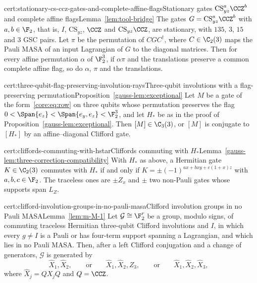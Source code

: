 
\begin{finitefact}{cert:stationary-cs-ccz-gates-and-complete-affine-flags}{Stationary gates $\mathrm{CS}_{yz}^a\CCZ^b$ and complete affine flags}{Lemma~\ref{lem:tool-bridge}}
The gates $G=\mathrm{CS}_{yz}^a\CCZ^b$ with $a,b\in\F_2$, that is, $I$, $\mathrm{CS}_{yz}$, $\CCZ$ and $\mathrm{CS}_{yz}\CCZ$, are stationary, with $135$, $3$, $15$ and $3$ GSC pairs. Let $\pi$ be the permutation of $CGC^\dagger$, where $C\in\C_2(3)$ maps the Pauli MASA of an input Lagrangian of $G$ to the diagonal matrices. Then for every affine permutation $\alpha$ of $\F_2^3$, if $\alpha\pi$ and the translations preserve a common complete affine flag, so do $\alpha$, $\pi$ and the translations.
\end{finitefact}

\begin{finitefact}{cert:three-qubit-flag-preserving-involution-rays}{Three-qubit involutions with a flag-preserving permutation}{Proposition~\ref{gauss-lem:exceptional}}
Let $M$ be a gate of the form~\eqref{core:eq:row} on three qubits whose permutation preserves the flag $0<\Span\{e_z\}<\Span\{e_y,e_z\}<\F_2^3$, and let $H_*$ be as in the proof of Proposition~\ref{gauss-lem:exceptional}. Then $[M]\in\C_3(3)$, or $[M]$ is conjugate to $[H_*]$ by an affine--diagonal Clifford gate.
\end{finitefact}

\begin{finitefact}{cert:cliffords-commuting-with-hstar}{Cliffords commuting with $H_*$}{Lemma~\ref{gauss-lem:three-correction-compatibility}}
With $H_*$ as above, a Hermitian gate $K\in\C_2(3)$ commutes with $H_*$ if and only if $K=\pm(-1)^{ax+bxy+c(1+x)z}$ with $a,b,c\in\F_2$. The traceless ones are $\pm Z_x$ and $\pm$ two non-Pauli gates whose supports span $L_Z$.
\end{finitefact}

\begin{finitefact}{cert:clifford-involution-groups-in-no-pauli-masa}{Clifford involution groups in no Pauli MASA}{Lemma~\ref{lem:m-M-1}}
Let $\mathcal G\cong\F_2^r$ be a group, modulo signs, of commuting traceless Hermitian three-qubit Clifford involutions and $I$, in which every $g\ne I$ is a Pauli or has four-term support spanning a Lagrangian, and which lies in no Pauli MASA\@. Then, after a left Clifford conjugation and a change of generators, $\mathcal G$ is generated by
\[
\hat X_1,\hat X_2,\qquad\text{or}\qquad \hat X_1,\hat X_2,Z_3,\qquad\text{or}\qquad \hat X_1,\hat X_2,\hat X_3,
\]
where $\hat X_j=QX_jQ$ and $Q=\CCZ$.
\end{finitefact}

